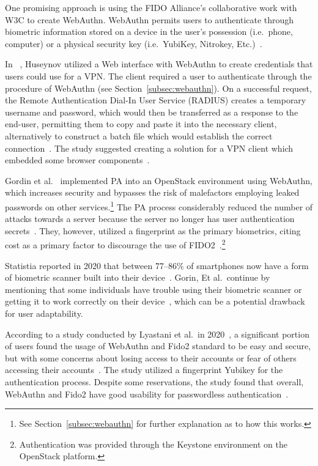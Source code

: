 One promising approach is using the FIDO Alliance's collaborative work with W3C to create WebAuthn.
WebAuthn permits users to authenticate through biometric information
stored on a device in the user's possession (i.e.\ phone, computer) or a
physical security key (i.e.\ YubiKey, Nitrokey, Etc.)~\cite{webauthn_level_2}.

In ~\cite{huseynov2022passwordless}, Huseynov utilized a
Web interface with WebAuthn to create credentials that users could use for a VPN\@.
The client required a user to authenticate through the procedure of WebAuthn (see Section~\ref{subsec:webauthn}).
On a successful request, the Remote Authentication Dial-In User Service (RADIUS) creates a temporary username and password, which would then be transferred
as a response to the end-user, permitting them to copy and paste it into the necessary client, alternatively to construct a batch file which would establish the correct connection~\cite{huseynov2022passwordless}.
The study suggested creating a solution for a VPN client which embedded some browser components~\cite{huseynov2022passwordless}.

Gordin et al.~\cite{gordin2021moving} implemented PA into an OpenStack
environment using WebAuthn, which increases security and bypasses the risk of
malefactors employing leaked passwords on other services.\footnote{
  See Section~\ref{subsec:webauthn} for further explanation as to how this
  works.
}
The PA process considerably reduced the number of attacks towards a server
because the server no longer has user authentication
secrets~\cite{gordin2021moving}.
They, however, utilized a fingerprint as the primary biometrics, citing cost as
a primary factor to discourage the use of FIDO2~\cite{gordin2021moving}.\footnote{
  Authentication was provided through the Keystone environment on the OpenStack
  platform.
}

Statistia reported in 2020 that between 77--86\% of smartphones now have a form
of biometric scanner built into their
device~\cite{statista-biometric-transactions}.
Gorin, Et al.\ continue by mentioning that some individuals have trouble
using their biometric scanner or getting it to work correctly on their
device~\cite{gordin2021moving}, which can be a potential drawback for user adaptability.

According to a study conducted by Lyastani et al.\ in
2020~\cite{ghrobany2020fido2}, a significant portion of users found the usage
of WebAuthn and Fido2 standard to be easy and secure, but with some concerns
about losing access to their accounts or fear of others accessing their
accounts~\cite{ghrobany2020fido2}.
The study utilized a fingerprint Yubikey for the authentication process.
Despite some reservations, the study found that overall, WebAuthn and Fido2
have good usability for passwordless authentication~\cite{ghrobany2020fido2}.

